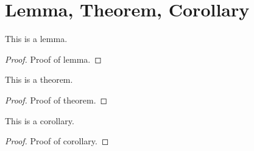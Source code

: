 \section{Lemma, Theorem, Corollary}
\begin{lemma}
    This is a lemma.
\end{lemma}
\begin{proof}
    Proof of lemma.
\end{proof}

\begin{theorem}
    This is a theorem.
\end{theorem}
\begin{proof}
    Proof of theorem.
\end{proof}

\begin{corollary}
    This is a corollary.
\end{corollary}
\begin{proof}
    Proof of corollary.
\end{proof}


